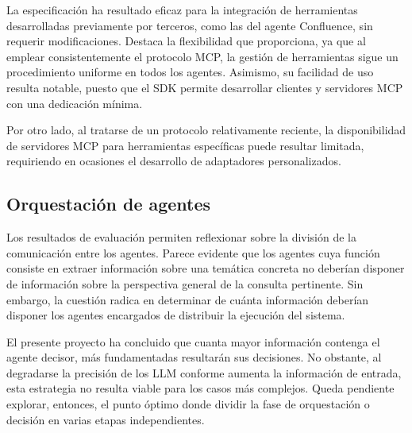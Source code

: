 La especificación ha resultado eficaz para la integración de herramientas desarrolladas previamente por terceros, como las del agente Confluence, sin requerir modificaciones. Destaca la flexibilidad que proporciona, ya que al emplear consistentemente el protocolo MCP, la gestión de herramientas sigue un procedimiento uniforme en todos los agentes. Asimismo, su facilidad de uso resulta notable, puesto que el SDK permite desarrollar clientes y servidores MCP con una dedicación mínima.

Por otro lado, al tratarse de un protocolo relativamente reciente, la disponibilidad de servidores MCP para herramientas específicas puede resultar limitada, requiriendo en ocasiones el desarrollo de adaptadores personalizados.

\subsection{Orquestación de agentes}
\label{sec:conc}
Los resultados de evaluación permiten reflexionar sobre la división de la comunicación entre los agentes. Parece evidente que los agentes cuya función consiste en extraer información sobre una temática concreta no deberían disponer de información sobre la perspectiva general de la consulta pertinente. Sin embargo, la cuestión radica en determinar de cuánta información deberían disponer los agentes encargados de distribuir la ejecución del sistema.

El presente proyecto ha concluido que cuanta mayor información contenga el agente decisor, más fundamentadas resultarán sus decisiones. No obstante, al degradarse la precisión de los LLM conforme aumenta la información de entrada, esta estrategia no resulta viable para los casos más complejos. Queda pendiente explorar, entonces, el punto óptimo donde dividir la fase de orquestación o decisión en varias etapas independientes.


